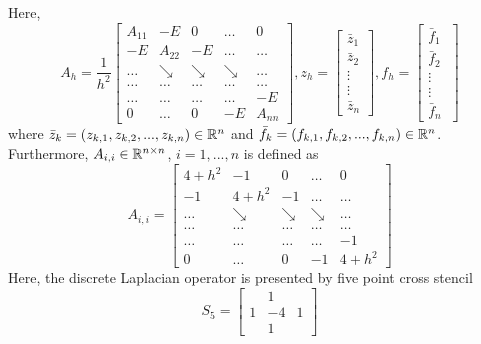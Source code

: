 \documentclass[11pt,a4paper,twoside]{article}
\begin{document}
Here,
\[
A_h = \frac{1}{h^2}
\begin{bmatrix}
    A_{11}       & -E          &  0              & \dots & 0 \\
    -E               & A_{22}  & -E              & \dots & \dots  \\
      \dots         & \searrow     & \searrow  & \searrow  & \dots  \\
      \dots         & \dots     & \dots         & \dots   &    \dots  \\
      \dots         & \dots    & \dots         & \dots & -E  \\
     0                 & \dots   &  0               & -E    & A_{nn}
\end{bmatrix}
,
z_h = 
\begin{bmatrix}
    \bar z_{1} \\
    \bar z_{2}  \\
    \vdots  \\
    \vdots  \\
    \bar z_{n}
\end{bmatrix}
,
f_h = 
\begin{bmatrix}
    \bar f_{1} \\
    \bar f_{2}  \\
    \vdots  \\
    \vdots  \\
    \bar f_{n}\
\end{bmatrix}
\]
where $\bar z_k = (z_{k,1}, z_{k,2}, ..., z_{k,n})\in \mathbb{R}^{n}$ and $\bar f_k = (f_{k,1}, f_{k,2}, ..., f_{k,n})\in \mathbb{R}^{n}$. Furthermore, $A_{i,i} \in \mathbb{R}^{n \times n}$, $i = 1, ..., n$ is defined as
\[
A_{i,i} = 
\begin{bmatrix}
    4+h^2       & -1          &  0              & \dots & 0 \\
    -1               & 4+h^2  & -1              & \dots & \dots  \\
      \dots         & \searrow     & \searrow  & \searrow  & \dots  \\
      \dots         & \dots     & \dots         & \dots   &    \dots  \\
      \dots         & \dots    & \dots         & \dots & -1  \\
     0                 & \dots   &  0               & -1    & 4+h^2
\end{bmatrix}
\]
Here, the discrete Laplacian operator is presented by five point cross stencil
\[
S_5 = 
\begin{bmatrix}
            &  1  &  \\
    1     &  -4    & 1\\
            &  1  &  
\end{bmatrix}
\]
\end{document}
